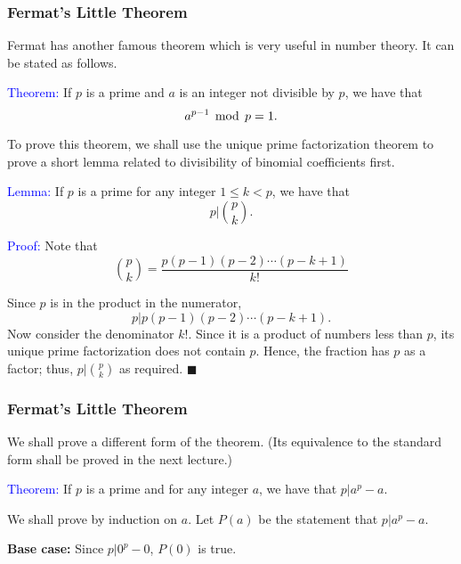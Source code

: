 \begin{frame}\frametitle{Fermat's Little Theorem}
  Fermat has another famous theorem which is very useful in number
  theory.  It can be stated as follows.

  \begin{tcolorbox}
    \textcolor{blue}{Theorem:} If $p$ is a prime and $a$ is an integer
    not divisible by $p$, we have that
    \[ a^{p-1}\,\bmod\, p = 1. \]
  \end{tcolorbox}

  To prove this theorem, we shall use the unique prime factorization
  theorem to prove a short lemma related to divisibility of binomial
  coefficients first.
\end{frame}

\begin{frame}
  \textcolor{blue}{Lemma:} If $p$ is a prime for any integer $1\leq
  k<p$, we have that
  \[
  p\Big|\binom{p}{k}.
  \]

  \textcolor{blue}{Proof:}  Note that
  \[\binom{p}{k}=\frac{p(p-1)(p-2)\cdots(p-k+1)}{k!}\]

  Since $p$ is in the product in the numerator,
  \[
  p|p(p-1)(p-2)\cdots(p-k+1).
  \]
  Now consider the denominator $k!$.
  Since it is a product of numbers less than $p$, its unique prime
  factorization does not contain $p$.  Hence, the fraction has $p$ as
  a factor; thus, $p|\binom{p}{k}$ as required. $\blacksquare$
\end{frame}

\begin{frame}\frametitle{Fermat's Little Theorem}
  We shall prove a different form of the theorem. (Its equivalence to
  the standard form shall be proved in the next lecture.)

  \begin{tcolorbox}
    \textcolor{blue}{Theorem:} If $p$ is a prime and for any integer
    $a$, we have that $p|a^p-a$.
  \end{tcolorbox}
  \begin{tcolorbox}[title=Proof]
    We shall prove by induction on $a$.  Let $P(a)$ be the statement
    that $p|a^p-a$.

    {\bf Base case:} Since $p|0^p-0$, $P(0)$ is true.
  \end{tcolorbox}
\end{frame}

